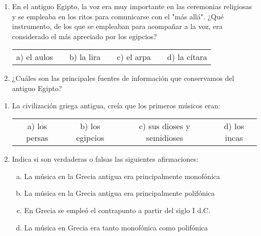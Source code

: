 \documentclass[letterpaper,12pt,notitlepage,spanish]{article}
\begin{document}
%
%
\begin{ejercicio}
	\begin{enumerate}[1.-]
%
%
		\item En el antiguo Egipto, la voz era muy importante en las ceremonias religiosas y se empleaba en los ritos para comunicarse con el "más allá". ¿Qué instrumento, de los que se empleaban para acompañar a la voz, era considerado el más apreciado por los egipcios?\par		
		\begin{tabular}{c c c c c c c}
		a) el aulos & & 
		b) la lira & & 
		c) el arpa & & 
		d) la cítara \\
		\end{tabular}
%
%
		\item ¿Cuáles son las principales fuentes de información que conservamos del antiguo Egipto?
		\vspace{2.25cm}
	\end{enumerate}
\end{ejercicio}
%
%
\begin{ejercicio}
	\begin{enumerate}[1.-]
%
%
		\item 
		La civilización griega antigua, creía que los primeros músicos eran: \par
		\begin{tabular}{c c c c}
		a) los persas & b) los egipcios & c) sus dioses y semidioses & d) los incas \\
		\end{tabular}
%
%
		\item Indica si son verdaderas o falsas las siguientes afirmaciones:
		\begin{enumerate}[a)]
		\item La música en la Grecia antigua era principalmente monofónica
		\item La música en la Grecia antigua era principalmente polifónica
		\item En Grecia se empleó el contrapunto a partir del siglo I d.C.
		\item La música en Grecia era tanto monofónica como polifónica
		\end{enumerate}
	\end{enumerate}
\end{ejercicio}
%
%
\end{document}
